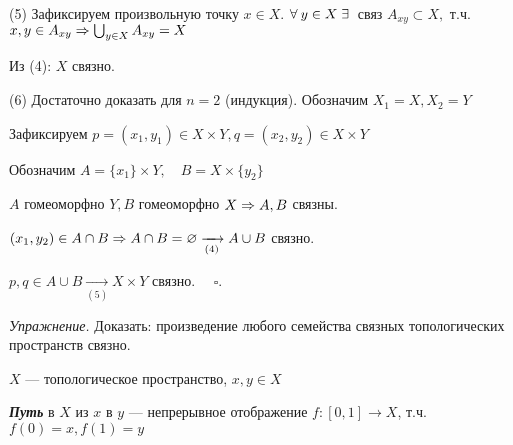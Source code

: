 \documentclass[../../main.tex]{subfiles}
\begin{document}
(5) Зафиксируем произвольную точку $x \in X$. $\forall\: y \in X\; \exists\:$ связ $A_{xy} \subset X,$ т.ч. $x, y\in A_{xy} \Rightarrow \bigcup_{y \in X} A_{xy} = X$

Из (4): $X$ связно.

(6) Достаточно доказать для $n = 2$ (индукция). Обозначим $X_1 = X, X_2 = Y$

Зафиксируем $p = (x_1, y_1) \in X \times Y, q = (x_2, y_2) \in X \times Y$

\begin{minipage}{0.25\linewidth}
\end{minipage}
\begin{minipage}{0.75\linewidth}
Обозначим $A = \{ x_1\} \times Y, \quad B = X \times \{ y_2\}$

$A$ гомеоморфно $Y, B$ гомеоморфно $X \Rightarrow A, B$ связны.

$(x_1, y_2) \in A \cap B \Rightarrow A \cap B = \varnothing  \xrightarrow[(4)]{} A \cup B$ связно.

$p, q \in A \cup B \xrightarrow[(5)]{} X \times Y$ связно. $\quad \square$.
\end{minipage}

\textit{Упражнение.} Доказать: произведение любого семейства связных топологических пространств связно.

\vspace{10pt}

\begin{minipage}{0.8\linewidth}
 $X$ — топологическое пространство, $x, y \in X$

\textit{\textbf{Путь}} в $X$ из $x$ в $y$ — непрерывное отображение $f \colon [0,1] \to X$, т.ч. $f(0) = x, f(1) = y$

\end{minipage}
\begin{minipage}{0.2\linewidth}
\end{minipage}

\vspace{10pt}
\end{document}
